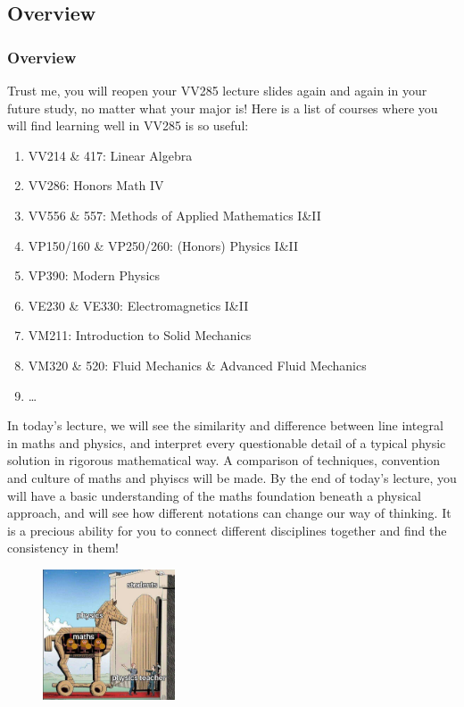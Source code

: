 \documentclass[11pt, t]{beamer}
\begin{document}
\subsection{Overview}
\begin{frame}[allowframebreaks]
    \frametitle{Overview}

    Trust me, you will reopen your VV285 lecture slides again and again in your future study, no matter what your major is! Here is a list of courses where you will find learning well in VV285 is so useful:
    \begin{enumerate}
        \item VV214 \& 417: Linear Algebra
        \item VV286: Honors Math IV
        \item VV556 \& 557: Methods of Applied Mathematics I\&II
        \item VP150/160 \& VP250/260: (Honors) Physics I\&II
        \item VP390: Modern Physics
        \item VE230 \& VE330: Electromagnetics I\&II
        \item VM211: Introduction to Solid Mechanics
        \item VM320 \& 520: Fluid Mechanics \& Advanced Fluid Mechanics
        \item \dots
    \end{enumerate}
    \newpage\footnotesize
    In today's lecture, we will see the similarity and difference between line integral in maths and physics, and interpret every questionable detail of a typical physic solution in rigorous mathematical way. A comparison of techniques, convention and culture of maths and phyiscs will be made. By the end of today's lecture, you will have a basic understanding of the maths foundation beneath a physical approach, and will see how different notations can change our way of thinking. It is a precious ability for you to connect different disciplines together and find the consistency in them!
    \begin{figure}[h]
        \centering
        \includegraphics[width=0.35\textwidth]{2020-07-15-12-50-10.png}
    \end{figure}


\end{frame}
\end{document}
